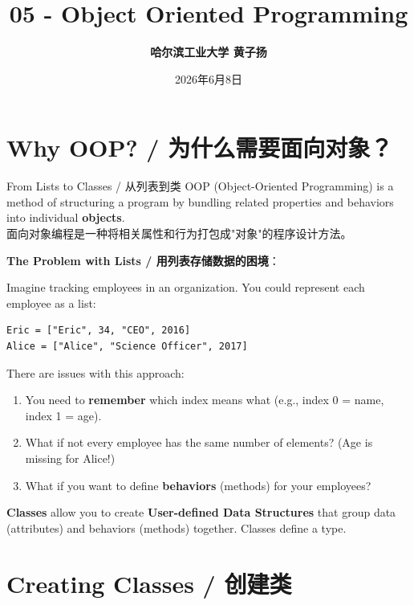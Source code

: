 \documentclass[11pt,a4paper]{article}
\title{\Huge \bfseries 05 - Object Oriented Programming}
\author{\Large \textbf{哈尔滨工业大学 \quad 黄子扬}}
\date{2026年6月8日}
\begin{document}
\maketitle
\tableofcontents
\newpage

\section{Why OOP? / 为什么需要面向对象？}

\begin{concept}{From Lists to Classes / 从列表到类}
    OOP (Object-Oriented Programming) is a method of structuring a program by bundling related properties and behaviors into individual \textbf{objects}. \\
    面向对象编程是一种将相关属性和行为打包成"对象"的程序设计方法。

    \textbf{The Problem with Lists / 用列表存储数据的困境}：

    Imagine tracking employees in an organization. You could represent each employee as a list:
\begin{lstlisting}
Eric = ["Eric", 34, "CEO", 2016]
Alice = ["Alice", "Science Officer", 2017]
\end{lstlisting}
    There are issues with this approach:
    \begin{enumerate}[itemsep=0.3em]
        \item You need to \textbf{remember} which index means what (e.g., index 0 = name, index 1 = age).
        \item What if not every employee has the same number of elements? (Age is missing for Alice!)
        \item What if you want to define \textbf{behaviors} (methods) for your employees?
    \end{enumerate}

    \textbf{Classes} allow you to create \textbf{User-defined Data Structures} that group data (attributes) and behaviors (methods) together. Classes define a type.
\end{concept}

\section{Creating Classes / 创建类}
\end{document}
